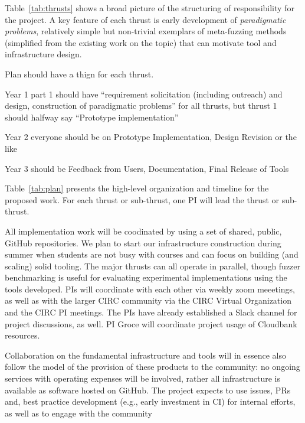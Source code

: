 Table~\ref{tab:thrusts} shows a broad picture of the structuring of
responsibility for the project.  A key feature of each thrust is early
development of \emph{paradigmatic problems}, relatively simple but
non-trivial exemplars of meta-fuzzing methods (simplified from the
existing work on the topic) that can motivate tool and infrastructure design.
                        
  Plan should have a thign for each thrust.

  Year 1 part 1 should have ``requirement solicitation (including
  outreach) and design, construction of paradigmatic problems'' for all
  thrusts, but thrust 1 should halfway say ``Prototype
  implementation''

  Year 2 everyone should be on Prototype Implementation, Design
  Revision or the like

  Year 3 should be Feedback from Users, Documentation, Final Release
  of Tools


Table~\ref{tab:plan} presents the high-level organization and timeline for the 
proposed
work. For each thrust or sub-thrust, one PI will lead the thrust or sub-thrust.

All implementation work will be coodinated by using a set of shared, public, 
GitHub repositories.    We plan to start our
infrastructure construction during summer when students are
not busy with courses and can focus on
building (and scaling) solid tooling.  The major thrusts can all operate in 
parallel, though fuzzer benchmarking is useful for evaluating experimental 
implementations using the tools developed.  PIs will coordinate with
each other via
weekly zoom meeetings, as well as with the larger CIRC community via the
CIRC Virtual Organization and the CIRC PI meetings.  The PIs have
already established a Slack channel for project discussions, as well.
PI Groce will coordinate project usage of Cloudbank resources.

Collaboration on the fundamental infrastructure and tools will in
essence also follow the model of the provision of these products to
the community: no ongoing services with operating expenses will be
involved, rather all infrastructure is available as software hosted on
GitHub.  The project expects to use issues, PRs and, best practice
development (e.g., early investment in CI)
for internal efforts, as well as to engage with the community


